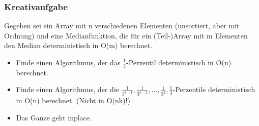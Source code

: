 \begin{frame}
\frametitle{Kreativaufgabe}
Gegeben sei ein Array mit n verschiedenen Elementen (unsortiert, aber mit Ordnung) und eine
Medianfunktion, die für ein (Teil-)Array mit m Elementen den Median deterministisch in O(m)
berechnet.
\begin{itemize}
\item Finde einen Algorithmus, der das $\frac{1}{3}$-Perzentil deterministisch in O(n) berechnet.
\item Finde einen Algorithmus, der die $\frac{1}{3^{k-1}},\frac{1}{3^{k-2}},\ldots,\frac{1}{3^2},\frac{1}{3}$-Perzentile deterministisch in O(n) berechnet. (Nicht in O(nk)!)
\item Das Ganze geht inplace.
\end{itemize}
\end{frame}
